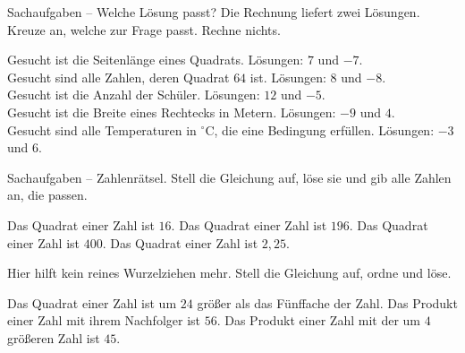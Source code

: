 \setcounter{aufgabe}{37}
\hypertarget{e5}{}

\begin{aufgabe}{Sachaufgaben -- Welche Lösung passt? Die Rechnung liefert zwei
Lösungen. Kreuze an, welche zur Frage passt. Rechne nichts.}
\begin{teile}
\teil Gesucht ist die Seitenlänge eines Quadrats. Lösungen: $7$ und $-7$. \\
  
\teil Gesucht sind alle Zahlen, deren Quadrat $64$ ist. Lösungen: $8$ und $-8$. \\
  
\teil Gesucht ist die Anzahl der Schüler. Lösungen: $12$ und $-5$. \\
  
\teil Gesucht ist die Breite eines Rechtecks in Metern. Lösungen: $-9$ und $4$. \\
  
\teil Gesucht sind alle Temperaturen in $^\circ$C, die eine Bedingung erfüllen.
Lösungen: $-3$ und $6$. \\
  
\end{teile}
\end{aufgabe}

\begin{aufgabe}{Sachaufgaben -- Zahlenrätsel. Stell die Gleichung auf, löse sie und
gib alle Zahlen an, die passen.}
\begin{teile}
\teil Das Quadrat einer Zahl ist $16$.
\teil Das Quadrat einer Zahl ist $196$.
\teil Das Quadrat einer Zahl ist $400$.
\teil Das Quadrat einer Zahl ist $2{,}25$.
\end{teile}
Hier hilft kein reines Wurzelziehen mehr. Stell die Gleichung auf, ordne und löse.
\begin{teile}
\setcounter{teil}{4}
\teil Das Quadrat einer Zahl ist um $24$ größer als das Fünffache der Zahl.
\teil Das Produkt einer Zahl mit ihrem Nachfolger ist $56$.
\teil Das Produkt einer Zahl mit der um $4$ größeren Zahl ist $45$.
\end{teile}
\end{aufgabe}

